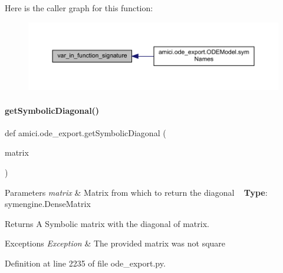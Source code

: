 Here is the caller graph for this function\+:
\nopagebreak
\begin{figure}[H]
\begin{center}
\leavevmode
\includegraphics[width=350pt]{namespaceamici_1_1ode__export_a365aaf8b78bb2db9c94b1a8087d60a16_icgraph}
\end{center}
\end{figure}
\mbox{\label{namespaceamici_1_1ode__export_aed240175cce2aa528fe24d1486c52559}} 
\paragraph{\texorpdfstring{get\+Symbolic\+Diagonal()}{getSymbolicDiagonal()}}
{\footnotesize\ttfamily def amici.\+ode\+\_\+export.\+get\+Symbolic\+Diagonal (\begin{DoxyParamCaption}\item[{}]{matrix }\end{DoxyParamCaption})}


\begin{DoxyParams}{Parameters}
{\em matrix} & Matrix from which to return the diagonal ~\newline
{\bfseries Type}\+: symengine.\+Dense\+Matrix\\
\hline
\end{DoxyParams}
\begin{DoxyReturn}{Returns}
A Symbolic matrix with the diagonal of {\ttfamily matrix}.
\end{DoxyReturn}

\begin{DoxyExceptions}{Exceptions}
{\em Exception} & The provided matrix was not square \\
\hline
\end{DoxyExceptions}


Definition at line 2235 of file ode\+\_\+export.\+py.

